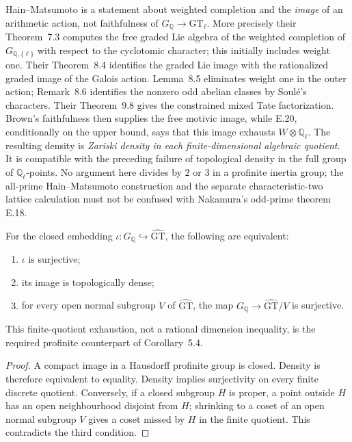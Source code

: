 Hain--Matsumoto is a statement about weighted completion and the
\emph{image} of an arithmetic action, not faithfulness of
$G_{\mathbb Q}\to\mathrm{GT}_{\ell}$.  More precisely their
Theorem~7.3 computes the free graded Lie algebra of the weighted
completion of $G_{\mathbb Q,\{\ell\}}$ with respect to the cyclotomic
character; this initially includes weight one.  Their Theorem~8.4
identifies the graded Lie image with the rationalized graded image of
the Galois action.  Lemma~8.5 eliminates weight one in the outer action;
Remark~8.6 identifies the nonzero odd abelian classes by Soul\'e's
characters.  Their Theorem~9.8 gives the constrained mixed Tate
factorization.  Brown's faithfulness then supplies the free motivic
image, while E.20, conditionally on the upper bound, says that this
image exhausts $W\otimes\mathbb Q_\ell$.  The resulting density is
\emph{Zariski density in each finite-dimensional algebraic quotient}.
It is compatible with the preceding failure of topological density in
the full group of $\mathbb Q_\ell$-points.  No argument here divides by
$2$ or $3$ in a profinite inertia group; the all-prime Hain--Matsumoto
construction and the separate characteristic-two lattice calculation
must not be confused with Nakamura's odd-prime theorem E.18.

For the closed embedding $\iota:G_{\mathbb Q}\hookrightarrow
\widehat{\mathrm{GT}}$, the following are equivalent:
\begin{enumerate}
\item $\iota$ is surjective;
\item its image is topologically dense;
\item for every open normal subgroup $V$ of
$\widehat{\mathrm{GT}}$, the map
$G_{\mathbb Q}\to\widehat{\mathrm{GT}}/V$ is surjective.
\end{enumerate}
This finite-quotient exhaustion, not a rational dimension inequality,
is the required profinite counterpart of Corollary~5.4.
\begin{proof}
A compact image in a Hausdorff profinite group is closed.  Density is
therefore equivalent to equality.  Density implies surjectivity on
every finite discrete quotient.  Conversely, if a closed subgroup $H$
is proper, a point outside $H$ has an open neighbourhood disjoint from
$H$; shrinking to a coset of an open normal subgroup $V$ gives a coset
missed by $H$ in the finite quotient.  This contradicts the third
condition.
\end{proof}

